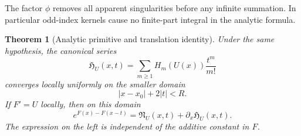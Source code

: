 \documentclass[11pt,a4paper]{article}
\newtheorem{theorem}{Theorem}[section]
\theoremstyle{definition}
\theoremstyle{remark}
\numberwithin{equation}{section}
\begin{document}
The factor $\phi$ removes all apparent singularities before any
infinite summation. In particular odd-index kernels cause no
finite-part integral in the analytic formula.

\begin{theorem}[Analytic primitive and translation identity]
\label{hp:analyticH}
Under the same hypothesis, the canonical series
\begin{equation}\label{hp:Hanalytic}
           \mathfrak H_U(x,t)=\sum_{m\ge1}H_m(U(x))\frac{t^m}{m!}
\end{equation}
converges locally uniformly on the smaller domain
\begin{equation}\label{hp:primitivedomain}
                        |x-x_0|+2|t|<R.
\end{equation}
If $F'=U$ locally, then on this domain
\begin{equation}\label{hp:translation}
 \boxed{\displaystyle
 e^{F(x)-F(x-t)}=\mathfrak N_U(x,t)
                               +\partial_x\mathfrak H_U(x,t).}
\end{equation}
The expression on the left is independent of the additive constant
in $F$.
\end{theorem}
\end{document}
